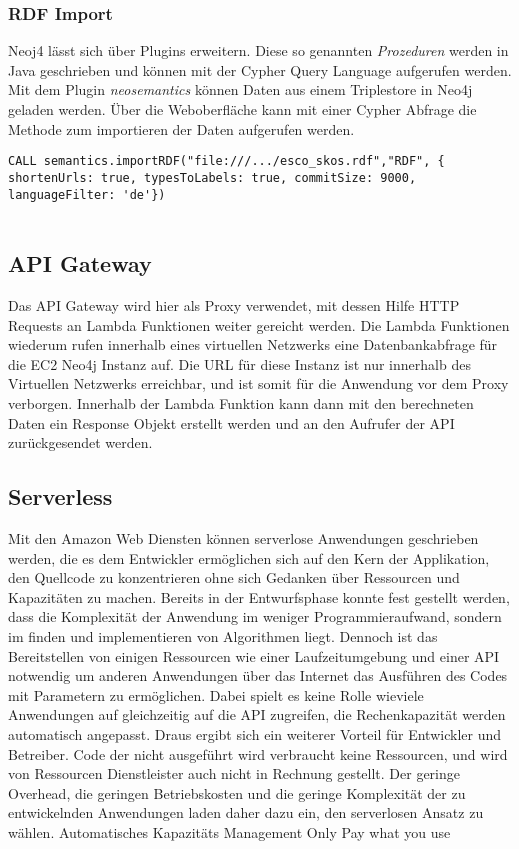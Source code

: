 \subsubsection{RDF Import}

Neoj4 lässt sich über Plugins erweitern. Diese so genannten \textit{Prozeduren} werden in Java geschrieben und können mit der Cypher Query Language aufgerufen werden.
Mit dem Plugin \textit{neosemantics} können Daten aus einem Triplestore in Neo4j geladen werden. Über die Weboberfläche kann mit einer Cypher Abfrage die Methode zum importieren der Daten aufgerufen werden. 

\lstset{language=xml}
\lstset{language=java}
\lstset{breaklines=true}
\begin{lstlisting}[frame=htrbl, caption={importRDF Prozeduraufruf}, label={lst:importRDF}]
CALL semantics.importRDF("file:///.../esco_skos.rdf","RDF", { shortenUrls: true, typesToLabels: true, commitSize: 9000, languageFilter: 'de'})


\end{lstlisting}


\subsection{API Gateway}

Das API Gateway wird hier als Proxy verwendet, mit dessen Hilfe HTTP Requests an Lambda Funktionen weiter gereicht werden. Die Lambda Funktionen wiederum rufen innerhalb eines virtuellen Netzwerks eine Datenbankabfrage für die EC2 Neo4j Instanz auf. Die URL für diese Instanz ist nur innerhalb des Virtuellen Netzwerks erreichbar, und ist somit für die Anwendung vor dem Proxy verborgen. Innerhalb der Lambda Funktion kann dann mit den berechneten Daten ein Response Objekt erstellt werden und an den Aufrufer der API zurückgesendet werden. 

\subsection{Serverless}

Mit den Amazon Web Diensten können serverlose Anwendungen geschrieben werden, die es dem Entwickler ermöglichen sich auf den Kern der Applikation, den Quellcode zu konzentrieren ohne sich Gedanken über Ressourcen und Kapazitäten zu machen. Bereits in der Entwurfsphase konnte fest gestellt werden, dass die Komplexität der Anwendung im weniger Programmieraufwand, sondern im finden und implementieren von Algorithmen liegt. Dennoch ist das Bereitstellen von einigen Ressourcen wie einer Laufzeitumgebung und einer API notwendig um anderen Anwendungen über das Internet das Ausführen des Codes mit Parametern zu ermöglichen. Dabei spielt es keine Rolle wieviele Anwendungen auf gleichzeitig auf die API zugreifen, die Rechenkapazität werden automatisch angepasst. Draus ergibt sich ein weiterer Vorteil für Entwickler und Betreiber. Code der nicht ausgeführt wird verbraucht keine Ressourcen, und wird von Ressourcen Dienstleister auch nicht in Rechnung gestellt. 
Der geringe Overhead, die geringen Betriebskosten und die geringe Komplexität der zu entwickelnden Anwendungen laden daher dazu ein, den serverlosen Ansatz zu wählen. 
Automatisches Kapazitäts Management
Only Pay what you use
 

